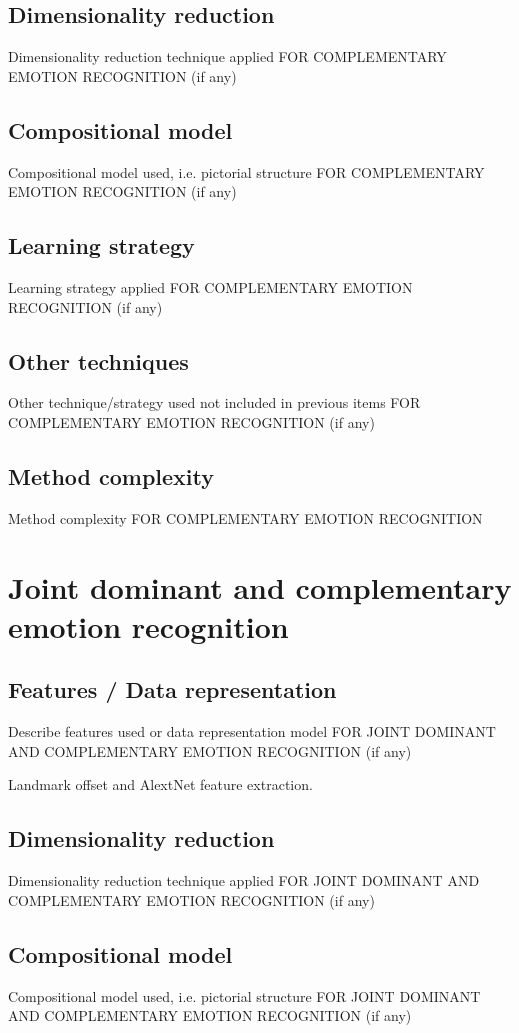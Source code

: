 \documentclass{article}
\begin{document}
\subsection{Dimensionality reduction}
Dimensionality reduction technique applied FOR COMPLEMENTARY EMOTION RECOGNITION (if any)

\subsection{Compositional model}
Compositional model used, i.e. pictorial structure FOR COMPLEMENTARY EMOTION RECOGNITION (if any)

\subsection{Learning strategy}
Learning strategy applied FOR COMPLEMENTARY EMOTION RECOGNITION (if any)

\subsection{Other techniques}
Other technique/strategy used not included in previous items FOR COMPLEMENTARY EMOTION RECOGNITION (if any)

\subsection{Method complexity}
Method complexity FOR COMPLEMENTARY EMOTION RECOGNITION


\section{Joint dominant and complementary emotion recognition}
\subsection{Features / Data representation}
Describe features used or data representation model FOR JOINT DOMINANT AND COMPLEMENTARY EMOTION RECOGNITION (if any)

Landmark offset and AlextNet feature extraction.
\subsection{Dimensionality reduction}
Dimensionality reduction technique applied FOR JOINT DOMINANT AND COMPLEMENTARY EMOTION RECOGNITION (if any)

\subsection{Compositional model}
Compositional model used, i.e. pictorial structure FOR JOINT DOMINANT AND COMPLEMENTARY EMOTION RECOGNITION (if any)
\end{document}
